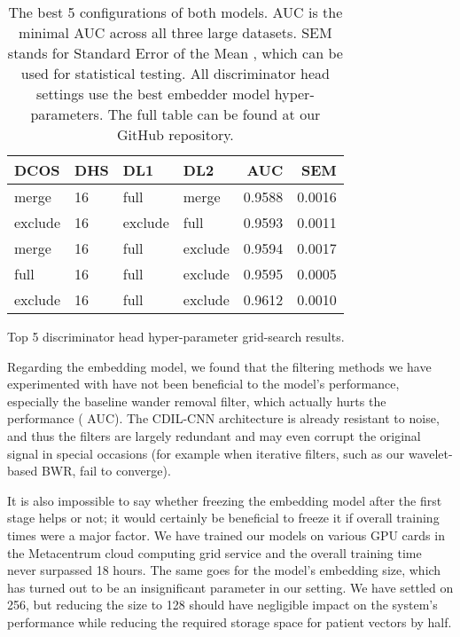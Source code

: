 \documentclass[preprint,12pt]{elsarticle}
\begin{document}
\begin{table}[!htb]
    \begin{subtable}{\linewidth}
      \centering
        \begin{tabular}{llllrr}
            \toprule
            \textbf{DCOS} & \textbf{DHS} & \textbf{DL1} & \textbf{DL2} &  \textbf{AUC} & \textbf{SEM} \\
            \midrule
            merge &                        16 &                      full &                     merge &  0.9588 &  0.0016 \\
            exclude &                        16 &                      exclude &                      full &  0.9593 &  0.0011 \\
            merge &                        16 &                      full &                      exclude &  0.9594 &  0.0017\\
            full &                        16 &                      full &                      exclude &  0.9595 &  0.0005\\
            exclude &                        16 &                      full &                      exclude &  0.9612 &  0.0010\\
        \bottomrule
        \end{tabular}
        \caption{Top 5 discriminator head hyper-parameter grid-search results.}
        \label{tab:gridsearch-2}
    \end{subtable} 
    \caption{The best 5 configurations of both models. AUC is the minimal AUC across all three large datasets. SEM stands for Standard Error of the Mean , which can be used for statistical testing. All discriminator head settings use the best embedder model hyper-parameters. The full table can be found at our GitHub repository.}
\end{table}

Regarding the embedding model, we found that the filtering methods we have experimented with have not been beneficial to the model's performance, especially the baseline wander removal filter, which actually hurts the performance ( AUC). The CDIL-CNN architecture is already resistant to noise, and thus the filters are largely redundant and may even corrupt the original signal in special occasions (for example when iterative filters, such as our wavelet-based BWR, fail to converge). 

It is also impossible to say whether freezing the embedding model after the first stage helps or not; it would certainly be beneficial to freeze it if overall training times were a major factor. We have trained our models on various GPU cards in the Metacentrum cloud computing grid service and the overall training time never surpassed 18 hours. The same goes for the model's embedding size, which has turned out to be an insignificant parameter in our setting. We have settled on 256, but reducing the size to 128 should have negligible impact on the system's performance while reducing the required storage space for patient vectors by half.
\end{document}
